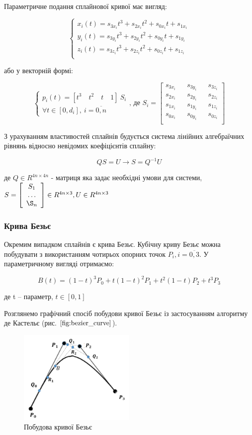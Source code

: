 \let\mypdfximage\pdfximage\def\pdfximage{\immediate\mypdfximage}\documentclass[14pt,a4paper]{extarticle}
\theoremstyle{definition}
\renewcommand{\[}{\begin{singlespace}\begin{equation*}}
\renewcommand{\]}{\end{equation*}\end{singlespace}}
\renewcommand{\+}{\discretionary{\mbox{\scriptsize$\hookleftarrow$}}{}{}}
\begin{document}
Параметричне подання сплайнової кривої має вигляд:
\[\left\{\begin{array}{l}
x_i(t)=s_{3x_i}t^3+s_{2x_i}t^2+s_{0x_i}t+s_{1x_i}\\
y_i(t)=s_{3y_i}t^3+s_{2y_i}t^2+s_{0y_i}t+s_{1y_i}\\
z_i(t)=s_{3z_i}t^3+s_{2z_i}t^2+s_{0z_i}t+s_{1z_i}\\
\end{array}\right.\]
або у  векторній формі:
\[\left\{\begin{array}{l}
p_i(t)=[t^3\quad t^2\quad t\quad 1]\ S_i\\
\forall t \in [0, d_i],\ i = \overline{0,n}
\end{array}\right.\text{, де }S_i=\left[\begin{matrix}
s_{3x_i} && s_{3y_i} && s_{3z_i} \\
s_{2x_i} && s_{2y_i} && s_{2z_i} \\
s_{1x_i} && s_{1y_i} && s_{1z_i} \\
s_{0x_i} && s_{0y_i} && s_{0z_i} \\
\end{matrix}\right]\]

З урахуванням властивостей сплайнів будується система лінійних алгебраїчних рівнянь відносно невідомих коефіцієнтів сплайну:
\[QS=U \to S=Q^{-1}U\]
де $Q\in R^{4n\times4n}$ - матриця яка задає необхідні умови для системи, 
$S=\left[\begin{array}{c}S_1\\\dots\\\S_n\end{array}\right]\in R^{4n\times3}, U \in R^{4n\times3}$

\subsubsection{Крива Безьє}

Окремим випадком сплайнів є крива Безьє. Кубічну криву Безьє можна побудувати з використанням чотирьох опорних точок $P_i, i=\overline{0,3}$. У параметричному вигляді отримаємо:
\[B(t)=(1-t)^3P_0+t(1-t)^2P_1+t^2(1-t)P_2+t^3P_3\]
де t -- параметр, $t \in [0,1]$

Розглянемо графічний спосіб побудови кривої Безьє із застосуванням алгоритму де Кастельє (рис. $\cite{fig:bezier_curve}$).

\begin{figure}[!htb]
    \centering
    \includegraphics[width=0.5\textwidth]{bezier-curve.png}
    \caption{Побудова кривої Безьє}\label{fig:bezier_curve}
\end{figure}
\end{document}
